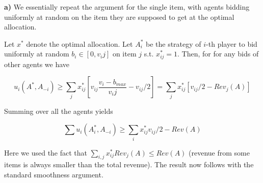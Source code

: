 \textbf{a)} We essentially repeat the argument for the single item, with agents bidding uniformly at random on the item they are supposed to get at the optimal allocation.

Let $x^*$ denote the optimal allocation. Let $A_i^*$ be the strategy of $i$-th player to bid uniformly at random $b_i\in[0,v_ij]$ on item $j$ s.t. $x_{ij}^*=1$. Then, for for any bids of other agents we have

$$
u_i(A^*,A_{-i}) \geq \sum_j x_{ij}^*[v_{ij} \frac{v_i-b_{max}}{v_ij} - v_{ij}/2]= \sum_j x_{ij}^*[v_{ij}/2-Rev_j(A)]
$$

Summing over all the agents yields

$$
\sum u_i(A_i^*,A_{-i}) \geq \sum_i x_{ij}^* v_{ij}/2 - Rev(A)
$$

Here we used the fact that $\sum_{i,j} x_{ij}^*Rev_j(A)\leq Rev(A)$ (revenue from some items is always smaller than the total revenue). The result now follows with the standard smoothness argument.